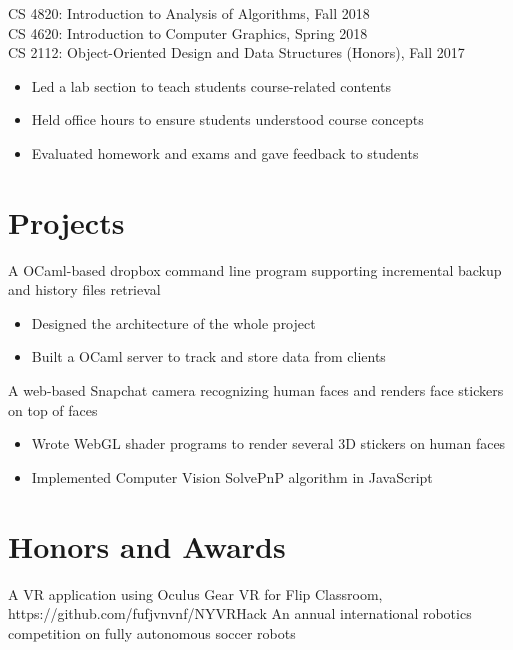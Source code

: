 \documentclass{resume}
\begin{document}
CS 4820: Introduction to Analysis of Algorithms, Fall 2018\\ 
CS 4620: Introduction to Computer Graphics, Spring 2018\\
CS 2112: Object-Oriented Design and Data Structures (Honors), Fall 2017
\begin{itemize}
  \item Led a lab section to teach students course-related contents
  \item Held office hours to ensure students understood course concepts
  \item Evaluated homework and exams and gave feedback to students
\end{itemize}

\section{Projects}
A OCaml-based dropbox command line program supporting incremental backup and history files retrieval
\begin{itemize}
  \item Designed the architecture of the whole project
  \item Built a OCaml server to track and store data from clients
\end{itemize}
A web-based Snapchat camera recognizing human faces and renders face stickers on top of faces
\begin{itemize}
  \item Wrote WebGL shader programs to render several 3D stickers on human faces
  \item Implemented Computer Vision SolvePnP algorithm in JavaScript
\end{itemize}

\section{Honors and Awards}
A VR application using Oculus Gear VR for Flip Classroom, https://github.com/fufjvnvnf/NYVRHack
An annual international robotics competition on fully autonomous soccer robots

%
%
\end{document}
